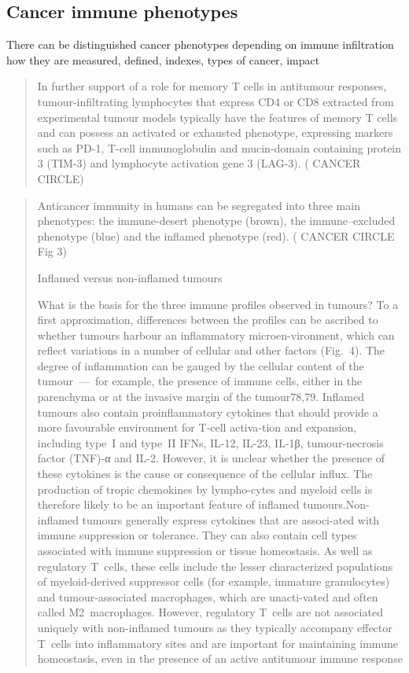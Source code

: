 \documentclass[12pt,]{book}
\theoremstyle{definition}
\theoremstyle{definition}
\theoremstyle{definition}
\theoremstyle{remark}
\begin{document}
\hypertarget{cancer-immune-phenotypes}{%
\subsection{Cancer immune phenotypes}\label{cancer-immune-phenotypes}}

There can be distinguished cancer phenotypes depending on immune
infiltration how they are measured, defined, indexes, types of cancer,
impact

\begin{quote}
In further support of a role for memory T cells in antitumour responses,
tumour-infiltrating lymphocytes that express CD4 or CD8 extracted from
experimental tumour models typically have the features of memory T cells
and can possess an activated or exhausted phenotype, expressing markers
such as PD-1, T-cell immunoglobulin and mucin-domain containing protein
3 (TIM-3) and lymphocyte activation gene 3 (LAG-3). (\citet{IMMUNE}
CANCER CIRCLE)
\end{quote}

\begin{quote}
Anticancer immunity in humans can be segregated into three main
phenotypes: the immune-desert phenotype (brown), the immune--excluded
phenotype (blue) and the inflamed phenotype (red). (\citet{IMMUNE}
CANCER CIRCLE Fig 3)

Inflamed versus non-inflamed tumours

What is the basis for the three immune profiles observed in tumours? To
a first approximation, differences between the profiles can be ascribed
to whether tumours harbour an inflammatory microen-vironment, which can
reflect variations in a number of cellular and other factors (Fig.~4).
The degree of inflammation can be gauged by the cellular content of the
tumour~---~for example, the presence of immune cells, either in the
parenchyma or at the invasive margin of the tumour78,79. Inflamed
tumours also contain proinflammatory cytokines that should provide a
more favourable environment for T-cell activa-tion and expansion,
including type~I and type~II IFNs, IL-12, IL-23, IL-1β, tumour-necrosis
factor (TNF)-α and IL-2. However, it is unclear whether the presence of
these cytokines is the cause or consequence of the cellular influx. The
production of tropic chemokines by lympho-cytes and myeloid cells is
therefore likely to be an important feature of inflamed
tumours.Non-inflamed tumours generally express cytokines that are
associ-ated with immune suppression or tolerance. They can also contain
cell types associated with immune suppression or tissue homeostasis. As
well as regulatory T~cells, these cells include the lesser characterized
populations of myeloid-derived suppressor cells (for example, immature
granulocytes) and tumour-associated macrophages, which are unacti-vated
and often called M2~macrophages. However, regulatory T~cells are not
associated uniquely with non-inflamed tumours as they typically
accompany effector T~cells into inflammatory sites and are important for
maintaining immune homeostasis, even in the presence of an active
antitumour immune response
\end{quote}
\end{document}
